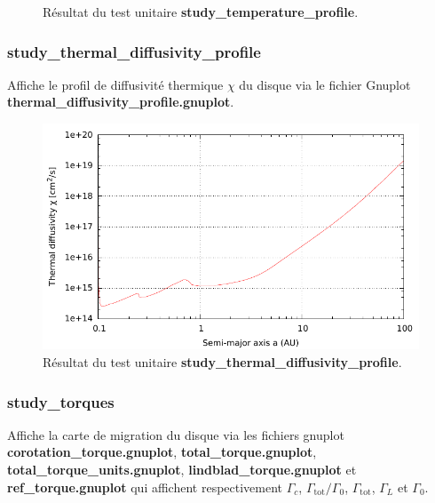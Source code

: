 \begin{figure}[htbp]
\centering
{}\hfill
{}
\caption{Résultat du test unitaire \textbf{study\_temperature\_profile}.}
\end{figure}

\subsubsection{study\_thermal\_diffusivity\_profile}
Affiche le profil de diffusivité thermique $\chi$ du disque via le fichier Gnuplot \textbf{thermal\_diffusivity\_profile.gnuplot}.

\begin{figure}[htbp]
\centering
\includegraphics[width=0.65\linewidth]{figure/unitary_tests/thermal_diffusivity_profile.pdf}
\caption{Résultat du test unitaire \textbf{study\_thermal\_diffusivity\_profile}.}
\end{figure}

\subsubsection{study\_torques}
Affiche la carte de migration du disque via les fichiers gnuplot \textbf{corotation\_torque.gnuplot}, \textbf{total\_torque.gnuplot}, \textbf{total\_torque\_units.gnuplot}, \textbf{lindblad\_torque.gnuplot} et \textbf{ref\_torque.gnuplot} qui affichent respectivement $\Gamma_c$, $\Gamma_\text{tot}/\Gamma_0$, $\Gamma_\text{tot}$, $\Gamma_L$ et $\Gamma_0$.

